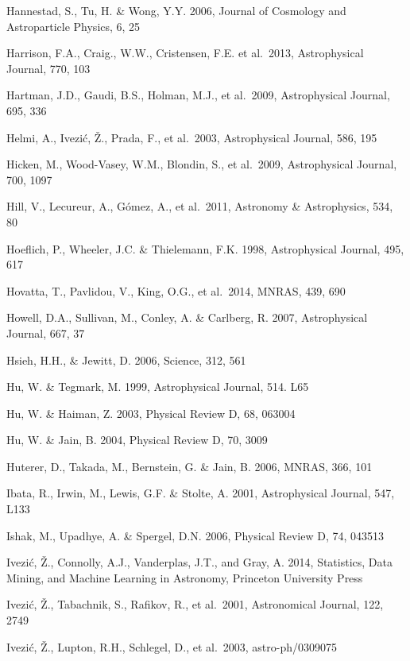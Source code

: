 \documentclass{emulateapj}
\begin{document}
\begin{thebibliography}{}
\bibitem[()]{} Hannestad, S., Tu, H. \& Wong, Y.Y. 2006, Journal of Cosmology and Astroparticle 
             Physics, 6, 25

\bibitem[()]{} Harrison, F.A., Craig., W.W., Cristensen, F.E. et
  al.~2013, Astrophysical Journal, 770, 103

\bibitem[()]{} Hartman, J.D., Gaudi, B.S., Holman, M.J., et al.~2009, Astrophysical Journal, 695, 336

\bibitem[()]{} Helmi, A., Ivezi\'{c}, \v{Z}., Prada, F., et al.~2003, Astrophysical Journal, 586, 195

\bibitem[()]{} Hicken, M., Wood-Vasey, W.M., Blondin, S., et al.~2009, Astrophysical Journal, 700, 1097

\bibitem[()]{} Hill, V., Lecureur, A., G{\'o}mez, A., et al.~2011, Astronomy \& Astrophysics, 534, 80 

\bibitem[()]{} Hoeflich, P., Wheeler, J.C. \& Thielemann, F.K. 1998, Astrophysical Journal, 495, 617

\bibitem[()]{} Hovatta, T., Pavlidou, V., King, O.G., et al.~2014, MNRAS, 439, 690	 

\bibitem[()]{} Howell, D.A., Sullivan, M., Conley, A. \& Carlberg, R. 2007, Astrophysical Journal, 667, 37

\bibitem[()]{} Hsieh, H.H., \& Jewitt, D. 2006, Science, 312, 561

\bibitem[()]{} Hu, W. \& Tegmark, M. 1999, Astrophysical Journal, 514. L65

\bibitem[()]{} Hu, W. \& Haiman, Z. 2003, Physical Review D, 68, 063004

\bibitem[()]{} Hu, W. \& Jain, B. 2004, Physical Review D, 70, 3009

\bibitem[()]{} Huterer, D., Takada, M., Bernstein, G. \& Jain, B. 2006, MNRAS, 366, 101
	
\bibitem[()]{} Ibata, R., Irwin, M., Lewis, G.F. \& Stolte, A. 2001, Astrophysical Journal, 547, L133
	
\bibitem[()]{} Ishak, M., Upadhye, A. \& Spergel, D.N. 2006, Physical Review D, 74, 043513

\bibitem[()]{} Ivezi\'c, \v Z., Connolly, A.J., Vanderplas, J.T., and
  Gray, A. 2014, Statistics, Data Mining, and Machine Learning in
  Astronomy, Princeton University Press

\bibitem[()]{} Ivezi\'{c}, \v{Z}., Tabachnik, S., Rafikov, R., et al.~2001, Astronomical Journal, 122, 2749
	
\bibitem[()]{} Ivezi\'c, \v Z., Lupton, R.H., Schlegel, D., et al.~2003, astro-ph/0309075


\end{thebibliography}
\end{document}
